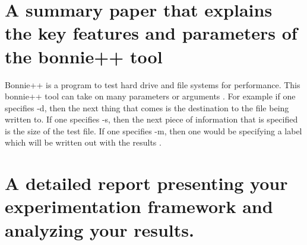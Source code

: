 \documentclass{article}
\begin{document}
\section{A summary paper that explains the key features and parameters of the bonnie++ tool}

Bonnie++ is a program to test hard drive and file systems for performance. This bonnie++ tool can take on many parameters or arguments \cite{coyle_2013}. For example if one specifies -d, then the next thing that comes is the destination to the file being written to. If one specifies -s, then the next piece of information that is specified is the size of the test file. If one specifies -m, then one would be specifying a label which will be written out with the results \cite{coyle_2013}.

\section{A detailed report presenting your experimentation framework and analyzing your results.}
\end{document}
